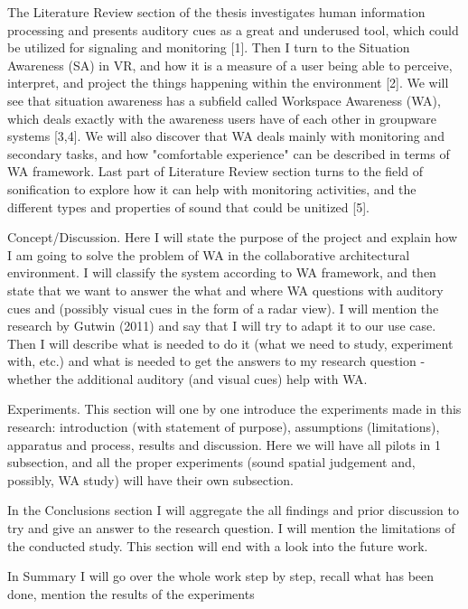 The Literature Review section of the thesis investigates human information processing and presents auditory cues as a great and underused tool, which could be utilized for signaling and monitoring [1]. Then I turn to the Situation Awareness (SA) in VR, and how it is a measure of a user being able to perceive, interpret, and project the things happening within the environment [2]. We will see that situation awareness has a subfield called Workspace Awareness (WA), which deals exactly with the awareness users have of each other in groupware systems [3,4]. We will also discover that WA deals mainly with monitoring and secondary tasks, and how "comfortable experience" can be described in terms of WA framework. Last part of Literature Review section turns to the field of sonification to explore how it can help with monitoring activities, and the different types and properties of sound that could be unitized [5].

Concept/Discussion. Here I will state the purpose of the project and explain how I am going to solve the problem of WA in the collaborative architectural environment. I will classify the system according to WA framework, and then state that we want to answer the what and where WA questions with auditory cues and (possibly visual cues in the form of a radar view). I will mention the research by Gutwin (2011) and say that I will try to adapt it to our use case. Then I will describe what is needed to do it (what we need to study, experiment with, etc.) and what is needed to get the answers to my research question - whether the additional auditory (and visual cues) help with WA.

Experiments. This section will one by one introduce the experiments made in this research: introduction (with statement of purpose), assumptions (limitations), apparatus and process, results and discussion. Here we will have all pilots in 1 subsection, and all the proper experiments (sound spatial judgement and, possibly, WA study) will have their own subsection.

In the Conclusions section I will aggregate the all findings and prior discussion to try and give an answer to the research question. I will mention the limitations of the conducted study. This section will end with a look into the future work. 

In Summary I will go over the whole work step by step, recall what has been done, mention the results of the experiments

